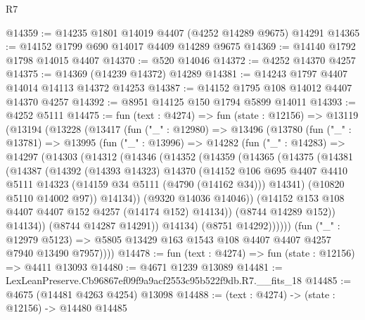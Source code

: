 \begin{lexlean}{R7}
\begin{coremodule}
@14359 := @14235 @1801 @14019 @4407 (@4252 @14289 @9675) @14291
@14365 := @14152 @1799 @690 @14017 @4409 @14289 @9675
@14369 := @14140 @1792 @1798 @14015 @4407
@14370 := @520 @14046
@14372 := @4252 @14370 @4257
@14375 := @14369 (@14239 @14372) @14289
@14381 := @14243 @1797 @4407 @14014 @14113 @14372 @14253
@14387 := @14152 @1795 @108 @14012 @4407 @14370 @4257
@14392 := @8951 @14125 @150 @1794 @5899 @14011
@14393 := @4252 @5111
@14475 := fun (text : @4274) =>
  fun (state : @12156) =>
  @13119
    (@13194
      (@13228
        (@13417
          (fun ("_" : @12980) =>
          @13496
            (@13780
              (fun ("_" : @13781) =>
              @13995
                (fun ("_" : @13996) =>
                @14282
                  (fun ("_" : @14283) =>
                  @14297
                    (@14303
                      (@14312
                        (@14346
                          (@14352
                            (@14359
                              (@14365
                                (@14375
                                  (@14381
                                    (@14387
                                      (@14392
                                        (@14393 @14323)
                                        @14370
                                        (@14152
                                          @106
                                          @695
                                          @4407
                                          @4410
                                          @5111
                                          @14323
                                          (@14159 @34 @5111 (@4790 (@14162 @34)))
                                          @14341)
                                        (@10820 @5110 @14002 @97))
                                      @14134))
                                  (@9320 @14036 @14046))
                                (@14152 @153 @108 @4407 @4407 @152 @4257 (@14174 @152) @14134))
                              (@8744 @14289 @152))
                            @14134))
                        (@8744 @14287 @14291))
                      @14134)
                    (@8751 @14292))))))
          (fun ("_" : @12979 @5123) =>
          @5805 @13429 @163 @1543 @108 @4407 @4407 @4257 @7940 @13490 @7957))))
@14478 := fun (text : @4274) => fun (state : @12156) => @4411 @13093
@14480 := @4671 @1239 @13089
@14481 := LexLeanPreserve.Cb96867ef09f9a9acf2553c95b522f9db.R7.__fits_18
@14485 := @4675 (@14481 @4263 @4254) @13098
@14488 := (text : @4274) -> (state : @12156) -> @14480 @14485

\end{coremodule}
\end{lexlean}
